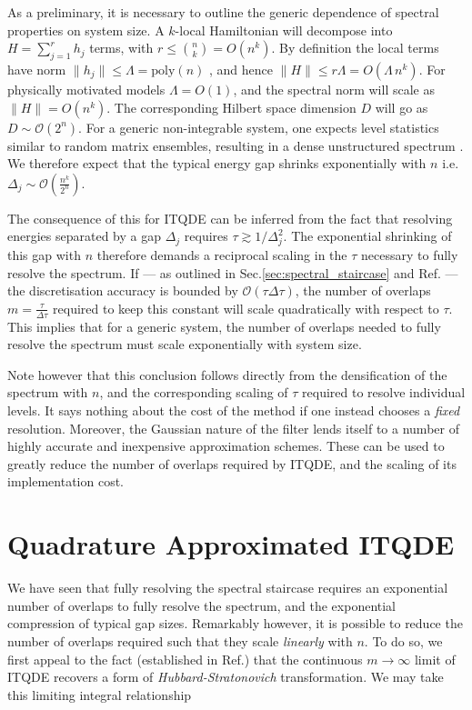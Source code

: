 \documentclass[reprint, aps,prx,showpacs,bibfootnote,preprintnumbers, mathtools, superscriptaddress, amsmath,amssymb]{revtex4-2}
\begin{document}
As a preliminary, it is necessary to outline the generic dependence of spectral properties on system size. A $k$-local Hamiltonian will decompose into $H=\sum_{j=1}^{r}h_{j}$ terms, with $r\le\binom{n}{k}=O(n^{k})$. By definition the local terms have norm $\|h_j\|\le \Lambda=\mathrm{poly}(n)$ \cite{kempe_complexity_2006, kitaev_classical_2002}, and hence
$\|H\|\le r\Lambda = O(\Lambda\,n^{k})$.
For physically motivated models $\Lambda = O(1)$, and the spectral norm will scale as $\|H\| = O(n^{k})$. The corresponding Hilbert space dimension $D$ will go as $D\sim \mathcal{O}(2^n)$. For a generic non-integrable system, one expects level statistics similar to random matrix ensembles, resulting in a dense unstructured spectrum \cite{haake2010,mehta2004}. We therefore expect that the typical energy gap shrinks exponentially with $n$ i.e. $\Delta_j \sim  \mathcal{O}(\frac{n^k}{2^n})$.

The consequence of this for ITQDE can be inferred from the fact that resolving energies separated by a gap $\Delta_j$ requires $\tau \gtrsim 1/\Delta^2_j$. The exponential shrinking of this gap with $n$ therefore demands a reciprocal scaling in the $\tau$ necessary to fully resolve the spectrum. If — as outlined in Sec.\ref{sec:spectral_staircase} and Ref.\cite{leamer_quantum_2024} — the discretisation accuracy is bounded by $\mathcal{O}(\tau \Delta \tau)$, the number of overlaps $m=\frac{\tau}{\Delta \tau}$ required to keep this constant will scale quadratically with respect to $\tau$. This implies that for a generic system, the number of overlaps needed to fully resolve the spectrum must scale exponentially with system size.

Note however that this conclusion follows directly from the densification of the spectrum with $n$, and the corresponding scaling of $\tau$ required to resolve individual levels. It says nothing about the cost of the method if one instead chooses a \textit{fixed} resolution. Moreover, the Gaussian nature of the filter lends itself to a number of highly accurate and inexpensive approximation schemes. These can be used to greatly reduce the number of overlaps required by ITQDE, and the scaling of its implementation cost.

\section{Quadrature Approximated ITQDE\label{sec:quadrature}}
We have seen that fully resolving the spectral staircase requires an exponential number of overlaps to fully resolve the spectrum, and the exponential compression of typical gap sizes. Remarkably however, it is possible to reduce the number of overlaps required such that they scale \textit{linearly} with $n$. To do so, we first appeal to the fact (established in Ref.\cite{leamer_quantum_2024})  that the continuous $m\to \infty$ limit of ITQDE recovers a form of \textit{Hubbard-Stratonovich} transformation. We may take this limiting integral relationship
\end{document}
